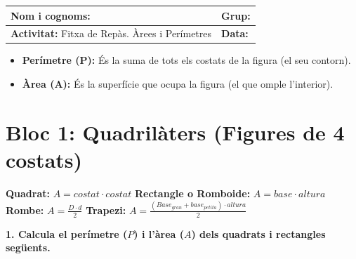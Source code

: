 \documentclass[12pt,a4paper]{article}
\begin{document}
\begingroup
\renewcommand{\arraystretch}{2.2}
\begin{tabularx}{\textwidth}{|X|p{4cm}|}
    \hline
    \textbf{Nom i cognoms:} & \textbf{Grup:} \\ \hline
    \textbf{Activitat:} Fitxa de Repàs. Àrees i Perímetres & \textbf{Data:} \\ \hline
\end{tabularx}
\endgroup

\vspace{0.5cm}

\begin{tcolorbox}[colback=gray!5,colframe=gray!80!black,title=\textbf{Conceptes Bàsics}]
    \begin{itemize}[leftmargin=*]
        \item \textbf{Perímetre (P):} És la suma de tots els costats de la figura (el seu contorn). 
        \item \textbf{Àrea (A):} És la superfície que ocupa la figura (el que omple l'interior).
    \end{itemize}
\end{tcolorbox}

\section*{Bloc 1: Quadrilàters (Figures de 4 costats)}

\begin{tcolorbox}[colback=blue!5,colframe=blue!75,title=\textbf{Fórmules per tenir a mà}]
    \textbf{Quadrat:} $A = costat \cdot costat$ \hspace{2cm} \textbf{Rectangle o Romboide:} $A = base \cdot altura$ \\
    \textbf{Rombe:} $A = \frac{D \cdot d}{2}$ \hspace{3.4cm} \textbf{Trapezi:} $A = \frac{(Base_{gran} + base_{petita}) \cdot altura}{2}$
\end{tcolorbox}

\textbf{1. Calcula el perímetre ($P$) i l'àrea ($A$) dels quadrats i rectangles següents.}
\end{document}
